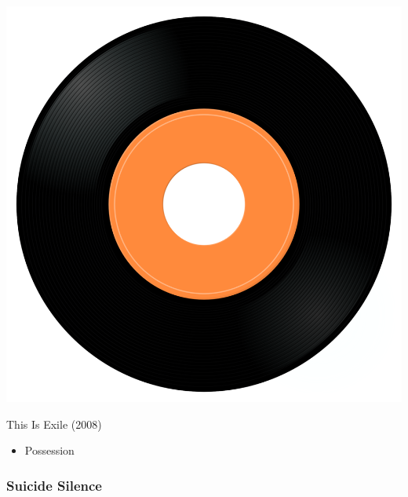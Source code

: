 \begin{minipage}[t]{0.25\textwidth}\vspace{0pt}
\captionsetup{type=figure}
\includegraphics[width=\textwidth]{Images/cover.png}
\caption*{This Is Exile (2008)}
\end{minipage}
\begin{minipage}[t]{0.25\textwidth}\vspace{0pt}
\begin{itemize}[nosep,leftmargin=1em,labelwidth=*,align=left]
	\setlength{\itemsep}{0pt}
	\item Possession 
\end{itemize}
\end{minipage}

\subsubsection{Suicide Silence}

